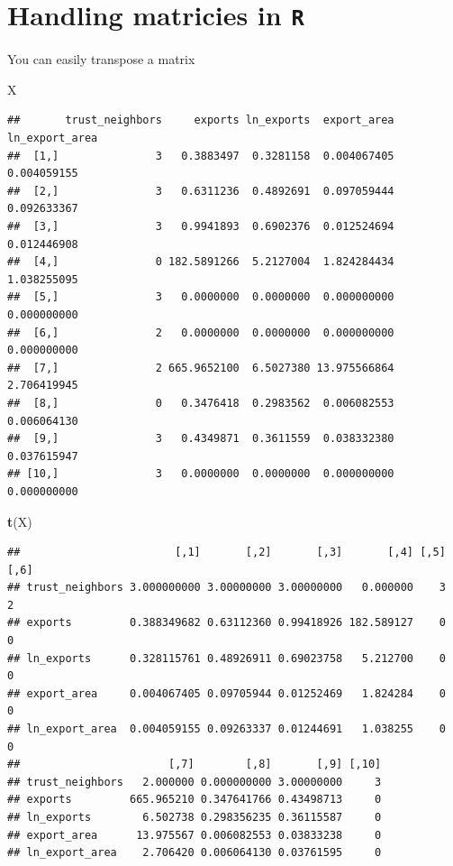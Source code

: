 \documentclass[]{book}
\newenvironment{Shaded}{\begin{snugshade}}{\end{snugshade}}
\newcommand{\KeywordTok}[1]{\textcolor[rgb]{0.13,0.29,0.53}{\textbf{#1}}}
\newcommand{\NormalTok}[1]{#1}
\theoremstyle{definition}
\theoremstyle{definition}
\theoremstyle{definition}
\theoremstyle{remark}
\begin{document}
\section{\texorpdfstring{Handling matricies in
\texttt{R}}{Handling matricies in R}}\label{handling-matricies-in-r}

You can easily transpose a matrix

\begin{Shaded}
\begin{Highlighting}[]
\NormalTok{X}
\end{Highlighting}
\end{Shaded}

\begin{verbatim}
##       trust_neighbors     exports ln_exports  export_area ln_export_area
##  [1,]               3   0.3883497  0.3281158  0.004067405    0.004059155
##  [2,]               3   0.6311236  0.4892691  0.097059444    0.092633367
##  [3,]               3   0.9941893  0.6902376  0.012524694    0.012446908
##  [4,]               0 182.5891266  5.2127004  1.824284434    1.038255095
##  [5,]               3   0.0000000  0.0000000  0.000000000    0.000000000
##  [6,]               2   0.0000000  0.0000000  0.000000000    0.000000000
##  [7,]               2 665.9652100  6.5027380 13.975566864    2.706419945
##  [8,]               0   0.3476418  0.2983562  0.006082553    0.006064130
##  [9,]               3   0.4349871  0.3611559  0.038332380    0.037615947
## [10,]               3   0.0000000  0.0000000  0.000000000    0.000000000
\end{verbatim}

\begin{Shaded}
\begin{Highlighting}[]
\KeywordTok{t}\NormalTok{(X)}
\end{Highlighting}
\end{Shaded}

\begin{verbatim}
##                        [,1]       [,2]       [,3]       [,4] [,5] [,6]
## trust_neighbors 3.000000000 3.00000000 3.00000000   0.000000    3    2
## exports         0.388349682 0.63112360 0.99418926 182.589127    0    0
## ln_exports      0.328115761 0.48926911 0.69023758   5.212700    0    0
## export_area     0.004067405 0.09705944 0.01252469   1.824284    0    0
## ln_export_area  0.004059155 0.09263337 0.01244691   1.038255    0    0
##                       [,7]        [,8]       [,9] [,10]
## trust_neighbors   2.000000 0.000000000 3.00000000     3
## exports         665.965210 0.347641766 0.43498713     0
## ln_exports        6.502738 0.298356235 0.36115587     0
## export_area      13.975567 0.006082553 0.03833238     0
## ln_export_area    2.706420 0.006064130 0.03761595     0
\end{verbatim}
\end{document}
